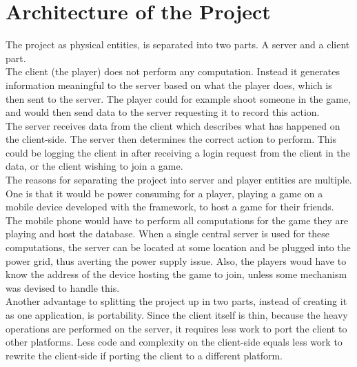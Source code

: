 \section{Architecture of the Project}
%
%

The project as physical entities, is separated into two parts. A server and a client part.\\

The client (the player) does not perform any computation. Instead it generates information meaningful to the server based on what the player does, which is then sent to the server. The player could for example shoot someone in the game, and would then send data to the server requesting it to record this action. \\

The server receives data from the client which describes what has happened on the client-side. The server then determines the correct action to perform. This could be logging the client in after receiving a login request from the client in the data, or the client wishing to join a game.\\

The reasons for separating the project into server and player entities are multiple. One is that it would be power consuming for a player, playing a game on a mobile device developed with the framework, to host a game for their friends. The mobile phone would have to perform all computations for the game they are playing and host the database. When a single central server is used for these computations, the server can be located at some location and be plugged into the power grid, thus averting the power supply issue. Also, the players woud have to know the address of the device hosting the game to join, unless some mechanism was devised to handle this.\\

Another advantage to splitting the project up in two parts, instead of creating it as one application, is portability. Since the client itself is thin, because the heavy operations are performed on the server, it requires less work to port the client to other platforms. Less code and complexity on the client-side equals less work to rewrite the client-side if porting the client to a different platform.